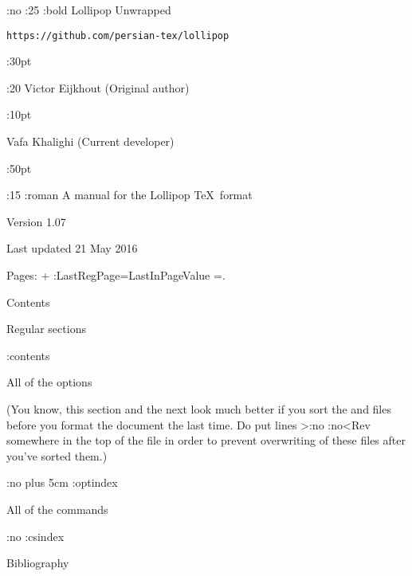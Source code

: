 %
%
%
%
%
%
\EmptyPage
\begingroup\AlwaysIndent:no
\PointSize:25 \Style:bold  Lollipop Unwrapped

{\tt https://github.com/persian-tex/lollipop}

\white:30pt

\PointSize:20 \SetFont Victor Eijkhout {\rm(Original author)}

\white:10pt

Vafa Khalighi    {\rm(Current developer)}

\white:50pt

\PointSize:15 \Style:roman
A manual for the Lollipop \TeX\ format\par
Version 1.07\par
Last updated 21 May 2016\par
Pages: \LastInPageCounter+\LastRegPageCounter
\AddToCounter:LastRegPage=LastInPageValue
=\LastRegPageCounter.

\EjectPage
\endgroup

\Chapter Contents

\Section Regular sections

\LoadExternalFile:contents



\Section All of the options

(You know, this section and the next look much better if you sort the
 and  files before you format the
document the last time. Do put lines
 \Ver>\Writeopindex:no
\Writecsindex:no<Rev somewhere in
the top of the  file in order to prevent 
overwriting of these files
after you've sorted them.)

\Indent:no \rightskip=0pt plus 5cm
\LoadExternalFile:optindex

\Section All of the commands

\Indent:no
\LoadExternalFile:csindex

\Section Bibliography




\endinput

